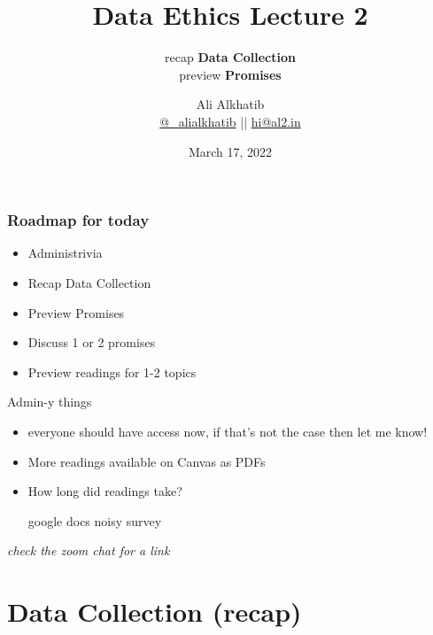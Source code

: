 \documentclass[aspectratio=43,17pt]{beamer} %
\title{Data Ethics Lecture 2}
\subtitle{recap {\bfseries Data Collection}\\preview {\bfseries Promises}}
\author[Ali Alkhatib]{{Ali Alkhatib}\\
\href{http://twitter.com/_alialkhatib}{@\_alialkhatib} || \href{mailto:hi@al2.in}{hi@al2.in}}
\date{March 17, 2022}
\newcommand{\onlyinsubfile}[1]{#1}
\newcommand{\notinsubfile}[1]{}
\begin{document}
\renewcommand{\onlyinsubfile}[1]{}
\renewcommand{\notinsubfile}[1]{#1}


\begin{frame}
\titlepage
\end{frame}

\begin{frame}[t]\frametitle{Roadmap for today}

\begin{itemize}
    \item Administrivia
    \item Recap Data Collection
    \item Preview Promises
    \item Discuss 1 or 2 promises
    \item Preview readings for 1-2 topics
\end{itemize}

\end{frame}


\begin{frame}{Admin-y things}
  

\begin{itemize}
    \item {}
    
    {\small everyone should have access now, if that's not the case then let me know!}
    \item {}
    
    {\small More readings available on Canvas as PDFs}
    \item {}

    {\small How long did readings take?

    \MVRightarrow{} google docs noisy survey}
    
\end{itemize}

\end{frame}

\begin{frame}[plain]

\centering
\emph{check the zoom chat for a link}

\end{frame}


\section{Data Collection (recap)}
\end{document}
